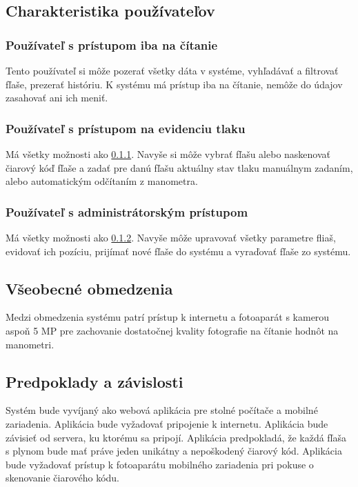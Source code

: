 \documentclass[hreffootnote]{zah}
\begin{document}
\subsection{Charakteristika používateľov}
\label{gen:users}

\subsubsection{Používateľ s prístupom iba na čítanie}
\label{gen:users:ro}

Tento používateľ si môže pozerať všetky dáta v systéme, vyhľadávať a filtrovať fľaše, prezerať históriu. K systému má prístup iba na čítanie, nemôže do údajov zasahovať ani ich meniť.

\subsubsection{Používateľ s prístupom na evidenciu tlaku}
\label{gen:users:meter}

Má všetky možnosti ako \ref{gen:users:ro}. Navyše si môže vybrať fľašu alebo naskenovať čiarový kóď fľaše a zadať pre danú fľašu aktuálny stav tlaku manuálnym zadaním, alebo automatickým odčítaním z manometra.

\subsubsection{Používateľ s administrátorským prístupom}
\label{gen:users:admin}

Má všetky možnosti ako \ref{gen:users:meter}. Navyše môže upravovať všetky parametre fliaš, evidovať ich pozíciu, prijímať nové fľaše do systému a vyraďovať fľaše zo systému.

\subsection{Všeobecné obmedzenia}
\label{gen:constraints}

Medzi obmedzenia systému patrí prístup k internetu a fotoaparát s kamerou aspoň 5 MP pre zachovanie dostatočnej kvality fotografie na čítanie hodnôt na manometri. 

\subsection{Predpoklady a závislosti}
\label{gen:deps}

Systém bude vyvíjaný ako webová aplikácia pre stolné počítače a mobilné zariadenia. Aplikácia bude vyžadovať pripojenie k internetu. Aplikácia bude závisieť od servera, ku ktorému sa pripojí. Aplikácia predpokladá, že každá fľaša s plynom bude mať práve jeden unikátny a nepoškodený čiarový kód. Aplikácia bude vyžadovať prístup k fotoaparátu mobilného zariadenia pri pokuse o skenovanie čiarového kódu.
\end{document}
